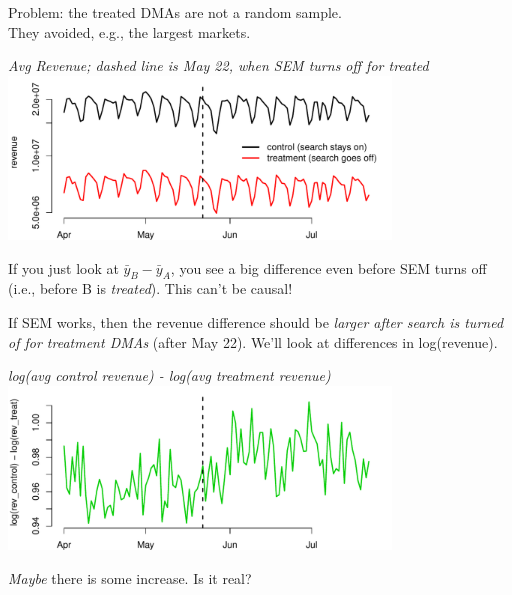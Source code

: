 \documentclass[11pt,xcolor=svgnames]{beamer}
\newcommand{\gr}{\color{black!60}}
\begin{document}
\begin{frame}

Problem: the treated DMAs are not a random sample.  \\They avoided, e.g., the largest markets.



\begin{center}
{\it \footnotesize Avg Revenue; dashed line is May 22, when SEM turns off for treated} 
\includegraphics[width=4in]{SEMrev}
\end{center}



If you just look at $\bar y_B - \bar y_A$, you see a big difference even before SEM turns off (i.e., before B is {\it treated}).  This can't be causal!

\end{frame}

\begin{frame}


If SEM works, then the revenue difference should be {\it larger after search is turned of for treatment DMAs}  (after May 22).
{\gr We'll look at differences in log(revenue).}

\begin{center}
{\footnotesize \it log(avg control revenue) - log(avg treatment revenue)}
\includegraphics[width=4in]{SEMdiff}
\end{center}


{{\it Maybe} there is some increase. Is it real?}

\end{frame}
\end{document}
